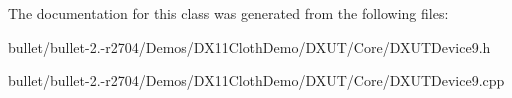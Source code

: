 The documentation for this class was generated from the following files\+:\begin{DoxyCompactItemize}
\item 
bullet/bullet-\/2.-\/r2704/\+Demos/\+D\+X11\+Cloth\+Demo/\+D\+X\+U\+T/\+Core/D\+X\+U\+T\+Device9.\+h\item 
bullet/bullet-\/2.-\/r2704/\+Demos/\+D\+X11\+Cloth\+Demo/\+D\+X\+U\+T/\+Core/D\+X\+U\+T\+Device9.\+cpp\end{DoxyCompactItemize}
